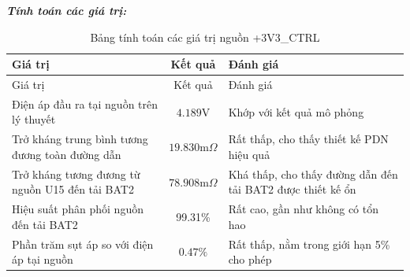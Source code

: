             \textbf{\textit{Tính toán các giá trị:}}
            \begin{longtable}{|p{}|c|p{}|}           
                \caption{Bảng tính toán các giá trị nguồn +3V3\_CTRL}\\
                \hline
                Giá trị & Kết quả & Đánh giá \\
                \hline
                \endfirsthead
                
                \hline
                Giá trị & Kết quả & Đánh giá \\
                \hline
                \endhead
                
                \hline
                \endfoot
                
                \hline
                \endlastfoot
                
                Điện áp đầu ra tại nguồn trên lý thuyết & $4.189\text{V}$ & Khớp với kết quả mô phỏng \\
                Trở kháng trung bình tương đương toàn đường dẫn & $19.830 \text{m}\Omega$ & Rất thấp, cho thấy thiết kế PDN hiệu quả \\
                Trở kháng tương đương từ nguồn U15 đến tải BAT2 & $78.908 \text{m}\Omega$ & Khá thấp, cho thấy đường dẫn đến tải BAT2 được thiết kế ổn \\
                Hiệu suất phân phối nguồn đến tải BAT2 & 99.31\% & Rất cao, gần như không có tổn hao \\
                Phần trăm sụt áp so với điện áp tại nguồn & $\mathbf{0.47\%}$ & Rất thấp, nằm trong giới hạn 5\% cho phép
                \label{tab:3v3_ctrl_calculation}\\

                \hline
            \end{longtable}
            
            